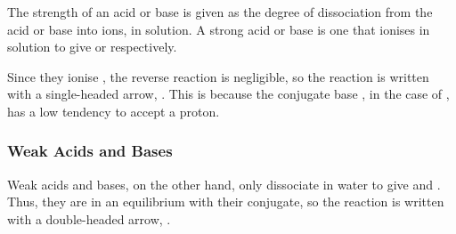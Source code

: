 				The strength of an acid or base is given as the degree of dissociation from the acid or base into ions, in solution. A strong
				acid or base is one that ionises  in solution to give  or  respectively.


				Since they ionise , the reverse reaction is negligible, so the reaction is written with a single-headed
				arrow, \ch{->}. This is because the conjugate base \ch{\Cl-}, in the case of , has a low tendency to
				accept a proton.



			\pagebreak
			\subsubsection{Weak Acids and Bases}

				Weak acids and bases, on the other hand, only dissociate  in water to give  and . Thus, they
				are in an equilibrium with their conjugate, so the reaction is written with a double-headed arrow, \ch{>=<}.



